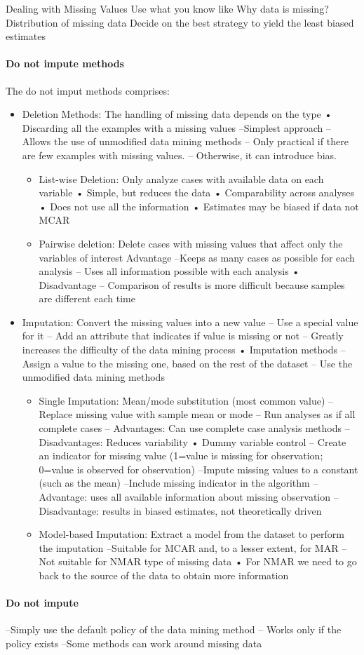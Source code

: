 Dealing with Missing Values
Use what you know like Why data is missing? Distribution of missing data
Decide on the best strategy to yield the least biased estimates
\paragraph*{Do not impute methods}
The do not imput methods comprises: 
\begin{itemize}
    \item Deletion Methods: The handling of missing data depends on the type
• Discarding all the examples with a missing values
–Simplest approach
– Allows the use of unmodified data mining methods
– Only practical if there are few examples with missing values.
– Otherwise, it can introduce bias.
        \begin{itemize}
            \item List-wise Deletion: Only analyze cases with available data on each variable
• Simple, but reduces the data
• Comparability across analyses
• Does not use all the information
• Estimates may be biased if data not MCAR
            \item Pairwise deletion: Delete cases with missing values that affect only the
variables of interest Advantage
–Keeps as many cases as possible for each analysis
– Uses all information possible with each analysis
• Disadvantage
– Comparison of results is more difficult because samples
are different each time
        \end{itemize}
    \item Imputation: Convert the missing values into a new value
– Use a special value for it
– Add an attribute that indicates if value is missing or not
– Greatly increases the difficulty of the data mining process
• Imputation methods
– Assign a value to the missing one, based on the rest of the dataset
– Use the unmodified data mining methods
        \begin{itemize}
            \item Single Imputation: Mean/mode substitution (most common value)
– Replace missing value with sample mean or mode
– Run analyses as if all complete cases
– Advantages: Can use complete case analysis methods
– Disadvantages: Reduces variability
• Dummy variable control
– Create an indicator for missing value (1=value is missing for observation; 0=value is
observed for observation)
–Impute missing values to a constant (such as the mean)
–Include missing indicator in the algorithm
– Advantage: uses all available information about missing observation
– Disadvantage: results in biased estimates, not theoretically driven
            \item Model-based Imputation: Extract a model from the dataset to perform the imputation
–Suitable for MCAR and, to a lesser extent, for MAR
– Not suitable for NMAR type of missing data
• For NMAR we need to go back to the source of the data to obtain more information
        \end{itemize}
\end{itemize}

\paragraph*{Do not impute}
–Simply use the default policy of the data mining method
– Works only if the policy exists
–Some methods can work around missing data
